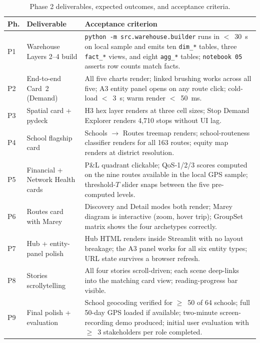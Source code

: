 \begin{table}[H]
\centering
\caption{Phase 2 deliverables, expected outcomes, and acceptance
criteria.}
\label{tab:appendix:deliverables}
\footnotesize
\renewcommand{\arraystretch}{1.2}
\begin{tabularx}{\linewidth}{p{0.7cm}p{3.6cm}X}
\hline
\textbf{Ph.} & \textbf{Deliverable} & \textbf{Acceptance criterion} \\
\hline
P1 & Warehouse Layers 2--4 build
   & \texttt{python -m src.warehouse.builder} runs in
     $<$~30~s on local sample and emits ten \texttt{dim\_*}
     tables, three \texttt{fact\_*} views, and eight
     \texttt{agg\_*} tables; \texttt{notebook 05} asserts row
     counts match facts. \\
P2 & End-to-end Card~2 (Demand)
   & All five charts render; linked brushing works across all
     five; A3 entity panel opens on any route click; cold-load
     $<$~3~s; warm render $<$~50~ms. \\
P3 & Spatial card + pydeck
   & H3 hex layer renders at three cell sizes; Stop Demand
     Explorer renders 4{,}710 stops without UI lag. \\
P4 & School flagship card
   & Schools $\rightarrow$ Routes treemap renders;
     school-routeness classifier renders for all 163 routes;
     equity map renders at district resolution. \\
P5 & Financial + Network Health cards
   & P\&L quadrant clickable; QoS-1/2/3 scores computed on the
     nine routes available in the local GPS sample;
     threshold-$T$ slider snaps between the five pre-computed
     levels. \\
P6 & Routes card with Marey
   & Discovery and Detail modes both render; Marey diagram is
     interactive (zoom, hover trip); GroupSet matrix shows the
     four archetypes correctly. \\
P7 & Hub + entity-panel polish
   & Hub HTML renders inside Streamlit with no layout
     breakage; the A3 panel works for all six entity types;
     URL state survives a browser refresh. \\
P8 & Stories scrollytelling
   & All four stories scroll-driven; each scene deep-links into
     the matching card view; reading-progress bar visible. \\
P9 & Final polish + evaluation
   & School geocoding verified for $\geq$~50 of 64 schools;
     full 50-day GPS loaded if available; two-minute
     screen-recording demo produced; initial user evaluation
     with $\geq$~3 stakeholders per role completed. \\
\hline
\end{tabularx}
\end{table}

